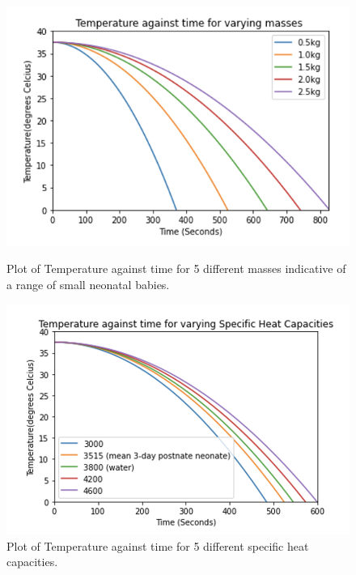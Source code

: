 \documentclass{article}
\begin{document}
 \begin{figure}[H]
\centering
\begin{minipage}{.48\linewidth}
    \captionsetup{justification=centering,margin=0cm}
    \includegraphics[width=\textwidth]{1.png}
    \caption{ Plot of Temperature against time for 5 different masses indicative of a range of small neonatal babies. }
    \label{Mass diff}
\end{minipage}
\hfill
\begin{minipage}{.48\linewidth}
    \captionsetup{justification=centering,margin=0.6cm}
    \includegraphics[width=\textwidth]{2.png}
    \caption{Plot of Temperature against time for 5 different specific heat capacities. }
    \label{Heat Capacities}
    \end{minipage}
\end{figure}
\end{document}
